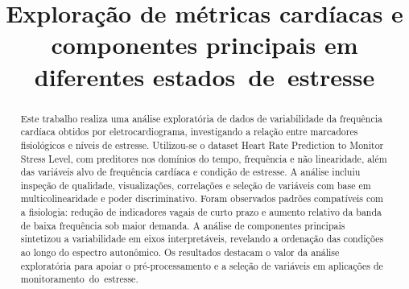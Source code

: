 \documentclass[conference]{IEEEtran}
\begin{document}
\newcommand{\thead}[1]{\begin{tabular}{@{}c@{}}#1\end{tabular}}

\title{Exploração de métricas cardíacas e componentes principais em diferentes estados de estresse\\
}

\author{
\and
{}
\and
{}
\and
{}
}

\maketitle

\begin{abstract}
Este trabalho realiza uma análise exploratória de dados de variabilidade da frequência cardíaca obtidos por eletrocardiograma, investigando a relação entre marcadores fisiológicos e níveis de estresse. Utilizou-se o dataset Heart Rate Prediction to Monitor Stress Level, com preditores nos domínios do tempo, frequência e não linearidade, além das variáveis alvo de frequência cardíaca e condição de estresse. A análise incluiu inspeção de qualidade, visualizações, correlações e seleção de variáveis com base em multicolinearidade e poder discriminativo. Foram observados padrões compatíveis com a fisiologia: redução de indicadores vagais de curto prazo e aumento relativo da banda de baixa frequência sob maior demanda. A análise de componentes principais sintetizou a variabilidade em eixos interpretáveis, revelando a ordenação das condições ao longo do espectro autonômico. Os resultados destacam o valor da análise exploratória para apoiar o pré-processamento e a seleção de variáveis em aplicações de monitoramento do estresse.
\end{abstract}
\end{document}
